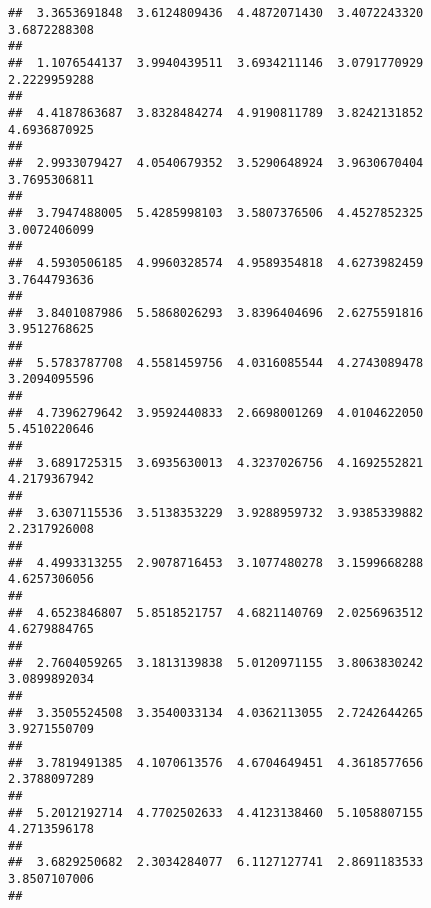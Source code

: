 \documentclass[]{article}
\begin{document}
\begin{verbatim}
##  3.3653691848  3.6124809436  4.4872071430  3.4072243320  3.6872288308 
##                                                                       
##  1.1076544137  3.9940439511  3.6934211146  3.0791770929  2.2229959288 
##                                                                       
##  4.4187863687  3.8328484274  4.9190811789  3.8242131852  4.6936870925 
##                                                                       
##  2.9933079427  4.0540679352  3.5290648924  3.9630670404  3.7695306811 
##                                                                       
##  3.7947488005  5.4285998103  3.5807376506  4.4527852325  3.0072406099 
##                                                                       
##  4.5930506185  4.9960328574  4.9589354818  4.6273982459  3.7644793636 
##                                                                       
##  3.8401087986  5.5868026293  3.8396404696  2.6275591816  3.9512768625 
##                                                                       
##  5.5783787708  4.5581459756  4.0316085544  4.2743089478  3.2094095596 
##                                                                       
##  4.7396279642  3.9592440833  2.6698001269  4.0104622050  5.4510220646 
##                                                                       
##  3.6891725315  3.6935630013  4.3237026756  4.1692552821  4.2179367942 
##                                                                       
##  3.6307115536  3.5138353229  3.9288959732  3.9385339882  2.2317926008 
##                                                                       
##  4.4993313255  2.9078716453  3.1077480278  3.1599668288  4.6257306056 
##                                                                       
##  4.6523846807  5.8518521757  4.6821140769  2.0256963512  4.6279884765 
##                                                                       
##  2.7604059265  3.1813139838  5.0120971155  3.8063830242  3.0899892034 
##                                                                       
##  3.3505524508  3.3540033134  4.0362113055  2.7242644265  3.9271550709 
##                                                                       
##  3.7819491385  4.1070613576  4.6704649451  4.3618577656  2.3788097289 
##                                                                       
##  5.2012192714  4.7702502633  4.4123138460  5.1058807155  4.2713596178 
##                                                                       
##  3.6829250682  2.3034284077  6.1127127741  2.8691183533  3.8507107006 
##                                                                       

\end{verbatim}
\end{document}
